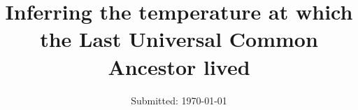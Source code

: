 
  \title{\vspace{-15mm}\fontsize{21pt}{10pt}\selectfont\textbf{Inferring the temperature at which the Last Universal Common Ancestor lived}}

	\date{Submitted: \usvardate\today}

\makeatletter
\renewcommand{\@maketitle}{
\newpage
 \null
 \vskip 2em%
 \begin{center}%
  {\LARGE \@title \par}%
 \end{center}%
 \par} \makeatother
